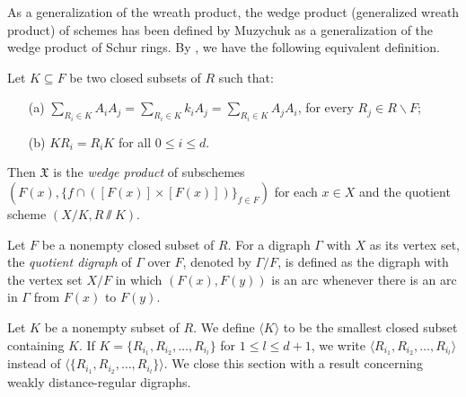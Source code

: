 \documentclass[12pt,a4paper]{amsart}
\theoremstyle{definition}
\begin{document}
As a generalization of the wreath product, the wedge  product (generalized wreath product) of schemes has been defined by Muzychuk \cite{M} as a generalization of the wedge product of Schur rings. By \cite[Theorem 2.3]{M}, we have the following equivalent definition.

Let $K\subseteq F$ be two closed subsets of $R$ such that:
\begin{itemize}
\item [{\rm(a)}] $\sum_{R_i\in K}A_iA_j=\sum_{R_i\in K}k_iA_j=\sum_{R_i\in K}A_jA_i$, for every $R_j\in R\backslash F$;

\item [{\rm(b)}] $KR_i=R_iK$ for all $0\leq i\leq d$.
\end{itemize}
Then $\mathfrak{X}$ is the \emph{wedge  product} of subschemes $(F(x),\{f\cap([F(x)]\times [F(x)])\}_{f\in F})$ for each $x\in X$ and the quotient scheme $(X/K, R \sslash K)$.

Let $F$ be a nonempty closed subset of $R$. For a digraph $\Gamma$ with $X$ as its vertex set, the \emph{quotient digraph} of $\Gamma$ over $F$, denoted by $\Gamma/F$, is defined as the digraph with the vertex set $X/F$ in which $( F(x),F(y))$ is an arc whenever there is an arc in $\Gamma$ from $F(x)$ to $F(y)$.

Let $K$ be a nonempty subset of $R$. We define $\langle K\rangle$ to be the smallest closed subset containing $K$. If $K=\{R_{i_1},R_{i_2},\ldots,R_{i_l}\}$ for $1\leq l\leq d+1$, we write $\langle R_{i_1},R_{i_2},\ldots,R_{i_l}\rangle$ instead of $\langle \{R_{i_1},R_{i_2},\ldots,R_{i_l}\} \rangle$. We close this section with a result concerning weakly distance-regular digraphs.
\end{document}
